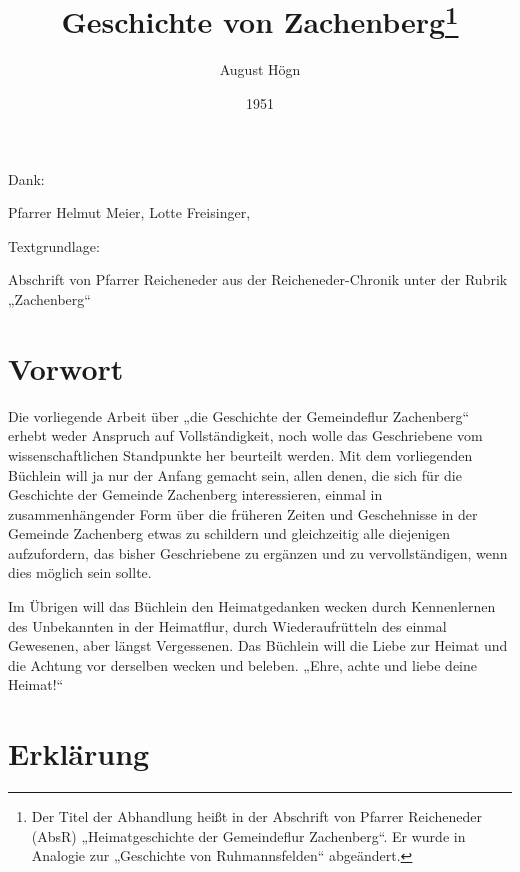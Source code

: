 \documentclass{book}
\author{August Högn}
\title{Geschichte von Zachenberg\footnote{Der Titel der Abhandlung heißt
in der Abschrift von Pfarrer Reicheneder (AbsR) „Heimatgeschichte der
Gemeindeflur Zachenberg“. Er wurde in Analogie zur „Geschichte von
Ruhmannsfelden“ abgeändert.}}
\date{1951}
\begin{document}
\maketitle

\begin{ersteseite}
Dank:

\bigskip

Pfarrer Helmut Meier, Lotte Freisinger,

\bigskip

Textgrundlage:

\bigskip

Abschrift von Pfarrer Reicheneder aus der Reicheneder-Chronik unter der
Rubrik „Zachenberg“

\end{ersteseite}

\tableofcontents

\newpage

\part{Vorwort}

Die vorliegende Arbeit über „die Geschichte der Gemeindeflur Zachenberg“
erhebt weder Anspruch auf Vollständigkeit, noch wolle das Geschriebene
vom wissenschaftlichen Standpunkte her beurteilt werden. Mit dem
vorliegenden Büchlein will ja nur der Anfang gemacht sein, allen denen,
die sich für die Geschichte der Gemeinde Zachenberg interessieren,
einmal in zusammenhängender Form über die früheren Zeiten und
Geschehnisse in der Gemeinde Zachenberg etwas zu schildern und
gleichzeitig alle diejenigen aufzufordern, das bisher Geschriebene zu
ergänzen und zu vervollständigen, wenn dies möglich sein sollte.

Im Übrigen will das Büchlein den Heimatgedanken wecken durch
Kennenlernen des Unbekannten in der Heimatflur, durch Wiederaufrütteln
des einmal Gewesenen, aber längst Vergessenen. Das Büchlein will die
Liebe zur Heimat und die Achtung vor derselben wecken und beleben.
„Ehre, achte und liebe deine Heimat!“

\part{Erklärung}
\end{document}
